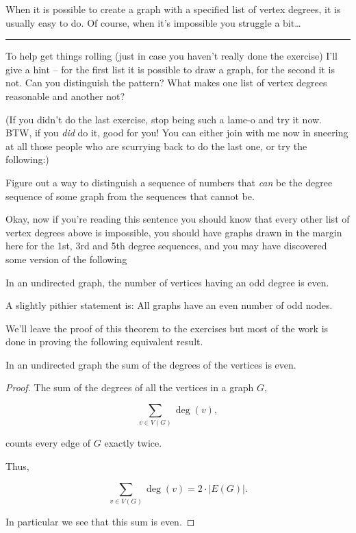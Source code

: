 When it is possible to create a graph with a specified list
of vertex degrees, it is usually easy to do.  Of course, when 
it's impossible you struggle a bit\ldots \rule{5pt}{0pt} 
To help get things rolling (just in case you haven't
really done the exercise) I'll give a hint -- for the first list it 
is possible to draw a graph, for the second it is not.  
Can you distinguish the pattern?  What makes one list
of vertex degrees reasonable and another not?

\begin{exer}
(If you didn't do the last exercise, stop being such a lame-o and 
try it now.  BTW, if you \emph{did} do it, good for you!  You can
either join with me now in sneering at all those people who are scurrying
back to do the last one, or try the following:)  

Figure out a way to distinguish a sequence of numbers that \emph{can} be
the degree sequence of some graph from the sequences that cannot be.
\end{exer}

Okay, now if you're reading this sentence you should know that every 
other list of vertex degrees above is impossible, you should have graphs
drawn in the margin here for the 1st, 3rd and 5th degree sequences, and
you may have discovered some version of the following

\begin{thm} 
In an undirected graph, the number of vertices having an odd degree is even.
\end{thm}

A slightly pithier statement is: All graphs have an even number of 
odd nodes.

We'll leave the proof of this theorem to the exercises but most of the
work is done in proving the following equivalent result.

\begin{thm}
In an undirected graph the sum of the degrees of the vertices is even.
\end{thm}

\begin{proof}
The sum of the degrees of all the vertices in a graph $G$,

\[ \sum_{v\in V(G)} \deg(v), \]

\noindent counts every edge of $G$ exactly twice.

Thus,

 \[ \sum_{v\in V(G)} \deg(v) = 2 \cdot |E(G)|. \]

In particular we see that this sum is even.

\end{proof}

